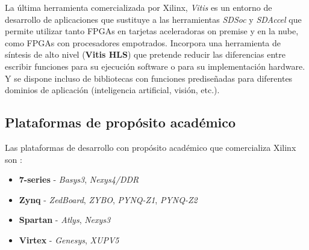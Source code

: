 La última herramienta comercializada por Xilinx, \textit{Vitis} \cite{vitis} es un entorno de desarrollo de aplicaciones que sustituye a las herramientas 
\textit{SDSoc} y \textit{SDAccel} que permite utilizar tanto FPGAs en tarjetas aceleradoras on premise y en la nube, como FPGAs con procesadores 
empotrados. Incorpora una herramienta de síntesis de alto nivel (\textbf{Vitis HLS}) que pretende reducir las diferencias entre escribir 
funciones para su ejecución software o para su implementación hardware. Y se dispone incluso de bibliotecas con funciones prediseñadas 
para diferentes dominios de aplicación (inteligencia artificial, visión, etc.).

\subsection{Plataformas de propósito académico}

Las plataformas de desarrollo con propósito académico que comercializa Xilinx son \cite{students} \cite{support}:

\begin{itemize}
    \item \textbf{7-series} - \textit{Basys3}, \textit{Nexys4/DDR}
    \item \textbf{Zynq} - \textit{ZedBoard}, \textit{ZYBO}, \textit{PYNQ-Z1}, \textit{PYNQ-Z2}
    \item \textbf{Spartan} - \textit{Atlys}, \textit{Nexys3}
    \item \textbf{Virtex} - \textit{Genesys}, \textit{XUPV5}
\end{itemize}

